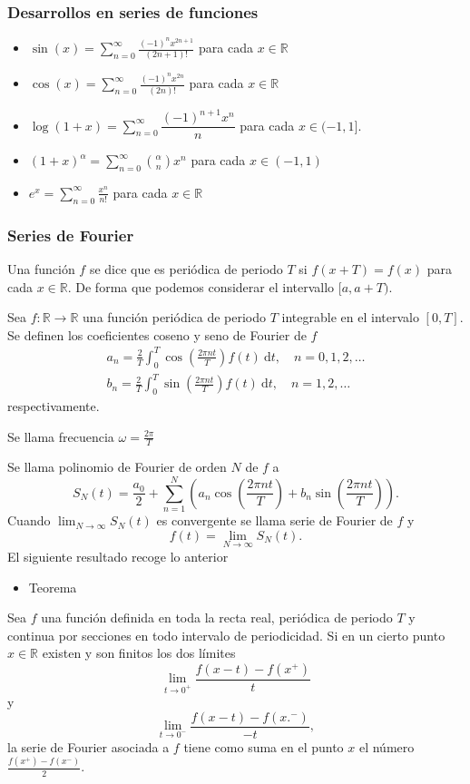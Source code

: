 \subsubsection{Desarrollos en series de funciones}
\begin{itemize}
\item $\sin(x)=\sum_{n=0}^{\infty} \frac{(-1)^{n}x^{2n+1}}{(2n+1)!}$ para cada $x \in\mathbb{R}$
\item $\cos(x)=\sum_{n=0}^{\infty} \frac{(-1)^{n}x^{2n}}{(2n)!}$ para cada $x \in\mathbb{R}$
\item $\log(1+x)=\sum_{n=0}^{\infty}\dfrac{(-1)^{n+1}x^{n}}{n}$ para cada $x\in(-1,1]$.
\item $(1+x)^{\alpha}=\sum_{n=0}^{\infty}\binom{\alpha}{n}x^{n}$ para cada $x \in(-1,1)$
\item $e^{x}=\sum_{n=0}^{\infty} \frac{x^{n}}{n!}$ para cada $x \in\mathbb{R}$
\end{itemize}
\subsubsection{Series de Fourier}
Una función $f$ se dice que es periódica de periodo $T$ si $f(x+T)=f(x)$ para cada $x \in\mathbb{R}$. De forma que podemos considerar el intervallo $[a,a+T)$.

Sea $f:\mathbb{R}\longrightarrow\mathbb{R}$ una función periódica de periodo $T$ integrable en el intervalo $[0,T]$. Se definen los coeficientes coseno y seno de Fourier de $f$
$$
\begin{array}{c}
a_{n}=\frac{2}{T}\int_{0}^{T}\cos\left( \frac{2\pi nt}{T} \right)f(t)\:\mathrm{d}t,\quad n=0,1,2,\dots \\
b_{n}=\frac{2}{T}\int_{0}^{T}\sin\left( \frac{2\pi nt}{T} \right) f(t)\:\mathrm{d}t,\quad n=1,2,\dots
\end{array}
$$
respectivamente.

Se llama frecuencia $\omega=\frac{2\pi}{T}$

Se llama polinomio de Fourier de orden $N$ de $f$ a
$$
S_{N}(t)=\frac{a_{0}}{2}+\sum_{n=1}^{N}\left( a_{n}\cos\left( \frac{2\pi nt}{T}\right)+b_{n}\sin\left( \frac{2\pi nt}{T}  \right) \right).
$$
Cuando $\lim_{ N \to \infty }S_{N}(t)$ es convergente se llama serie de Fourier de $f$ y
$$
f(t)=\lim_{ N \to \infty }S_{N}(t).
$$
El siguiente resultado recoge lo anterior
\begin{itemize}[label=\color{red}\textbullet, leftmargin=*]
	\item \color{lightblue}Teorema
\end{itemize}
Sea $f$ una función definida en toda la recta real, periódica de periodo $T$ y continua por secciones en todo intervalo de periodicidad. Si en un cierto punto $x\in\mathbb{R}$ existen y son finitos los dos límites
$$
\lim_{ t \to 0^{+} } \frac{f(x-t)-f(x^{+})}{t}
$$
y
$$
\lim_{ t \to 0^{-} }\frac{f(x-t)-f(x.^{-})}{-t},
$$
la serie de Fourier asociada a $f$ tiene como suma en el punto $x$ el número $\frac{f(x^{+})-f(x^{-})}{2}$.
